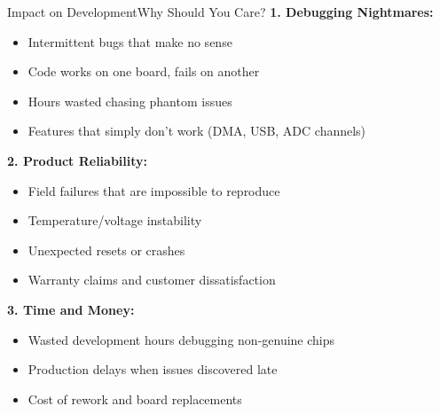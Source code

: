 \documentclass{beamer}
\begin{document}
\begin{frame}{Impact on Development}{Why Should You Care?}
	\textbf{1. Debugging Nightmares:}
	\begin{itemize}
		\item Intermittent bugs that make no sense
		\item Code works on one board, fails on another
		\item Hours wasted chasing phantom issues
		\item Features that simply don't work (DMA, USB, ADC channels)
	\end{itemize}
	
	\medskip
	\textbf{2. Product Reliability:}
	\begin{itemize}
		\item Field failures that are impossible to reproduce
		\item Temperature/voltage instability
		\item Unexpected resets or crashes
		\item Warranty claims and customer dissatisfaction
	\end{itemize}
	
	\medskip
	\textbf{3. Time and Money:}
	\begin{itemize}
		\item Wasted development hours debugging non-genuine chips
		\item Production delays when issues discovered late
		\item Cost of rework and board replacements
	\end{itemize}
\end{frame}
\end{document}
